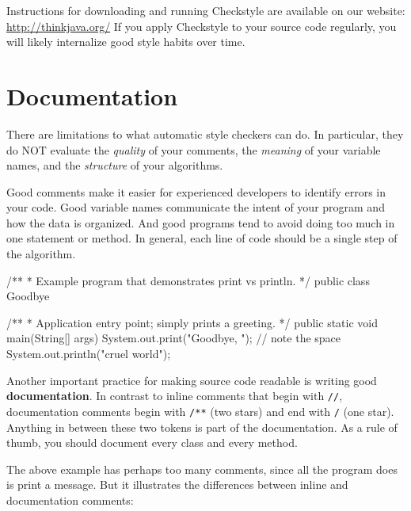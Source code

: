Instructions for downloading and running Checkstyle are available on our website: \url{http://thinkjava.org/}
If you apply Checkstyle to your source code regularly, you will likely internalize good style habits over time.


\section{Documentation}

There are limitations to what automatic style checkers can do.
In particular, they do NOT evaluate the {\em quality} of your comments, the {\em meaning} of your variable names, and the {\em structure} of your algorithms.

Good comments make it easier for experienced developers to identify errors in your code.
Good variable names communicate the intent of your program and how the data is organized.
And good programs tend to avoid doing too much in one statement or method.
In general, each line of code should be a single step of the algorithm.

\begin{code}
/**
 * Example program that demonstrates print vs println.
 */
public class Goodbye {

    /**
     * Application entry point; simply prints a greeting.
     */
    public static void main(String[] args) {
        System.out.print("Goodbye, ");  // note the space
        System.out.println("cruel world");
    }

}
\end{code}


Another important practice for making source code readable is writing good {\bf documentation}.
In contrast to inline comments that begin with {\tt //}, documentation comments begin with {\tt /**} (two stars) and end with {\tt */} (one star).
Anything in between these two tokens is part of the documentation.
As a rule of thumb, you should document every class and every method.

The above example has perhaps too many comments, since all the program does is print a message.
But it illustrates the differences between inline and documentation comments:

